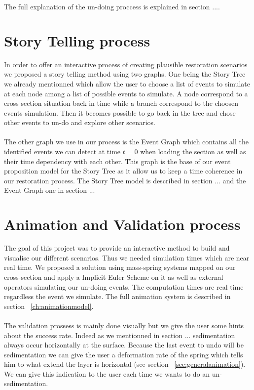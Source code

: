 \documentclass[12pt, a4paper]{memoir} %
\begin{document}
The full explanation of the un-doing proccess is explained in section ....

\section{Story Telling process}
In order to offer an interactive process of creating plausible restoration scenarios we proposed a story telling method using two graphs. One being the Story Tree we already mentionned which allow the user to choose a list of events to simulate at each node among a list of possible events to simulate. A node correspond to a cross section situation back in time while a branch correspond to the choosen events simulation. Then it becomes possible to go back in the tree and chose other events to un-do and explore other scenarios.\\\\
The other graph we use in our process is the Event Graph which contains all the identified events we can detect at time $t = 0$ when loading the section as well as their time dependency with each other. This graph is the base of our event proposition model for the Story Tree as it allow us to keep a time coherence in our restoration process. The Story Tree model is described in section ... and the Event Graph one in section ...
\section{Animation and Validation process}
The goal of this project was to provide an interactive method to build and visualise our different scenarios. Thus we needed simulation times which are near real time. We proposed a solution using mass-spring systems mapped on our cross-section and apply a Implicit Euler Scheme on it as well as external operators simulating our un-doing events. The computation times are real time regardless the event we simulate. The full animation system is described in section ~\ref{ch:animationmodel}.\\\\
The validation prossess is mainly done visually but we give the user some hints about the success rate.
Indeed as we mentionned in section ... sedimentation always occur horizontally at the surface. Because the last event to undo will be sedimentation we can give the user a deformation rate of the spring which tells him to what extend the layer is horizontal (see section ~\ref{sec:generalanimation}). We can give this indication to the user each time we wants to do an un-sedimentation.
\end{document}
